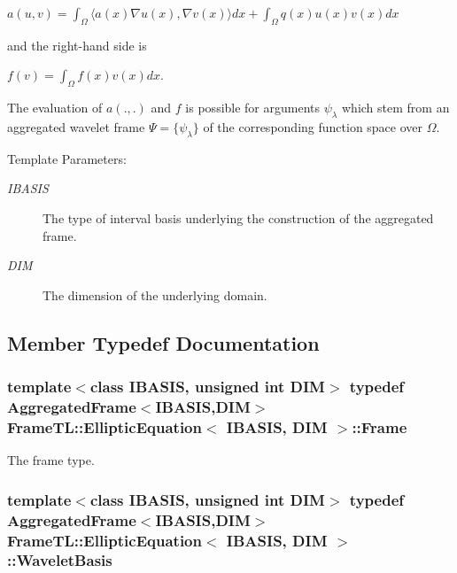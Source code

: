 $a(u,v) = \int_\Omega \langle a(x) \nabla u(x), \nabla v(x)\rangle dx + \int_\Omega q(x) u(x) v(x) dx$

and the right-hand side is

$f(v) = \int_\Omega f(x) v(x) dx$.

The evaluation of $a(.,.)$ and $f$ is possible for arguments $\psi_\lambda$ which stem from an aggregated wavelet frame $\Psi=\{\psi_\lambda\}$ of the corresponding function space over $\Omega$.

\begin{Desc}
\item[Template Parameters:]
\begin{description}
\item[{\em IBASIS}]The type of interval basis underlying the construction of the aggregated frame. \item[{\em DIM}]The dimension of the underlying domain. \end{description}
\end{Desc}


\subsection{Member Typedef Documentation}
\hypertarget{classFrameTL_1_1EllipticEquation_65fa5216492c8a03f841cf910182a00c}{
\subsubsection[Frame]{\setlength{\rightskip}{0pt plus 5cm}template$<$class IBASIS, unsigned int DIM$>$ {\bf typedef} {\bf AggregatedFrame}$<$IBASIS,DIM$>$ {\bf FrameTL::EllipticEquation}$<$ IBASIS, DIM $>$::{\bf Frame}}}
\label{classFrameTL_1_1EllipticEquation_65fa5216492c8a03f841cf910182a00c}


The frame type. \hypertarget{classFrameTL_1_1EllipticEquation_44b9abebf9c101271d3ddec1ce3ffd3a}{
\subsubsection[WaveletBasis]{\setlength{\rightskip}{0pt plus 5cm}template$<$class IBASIS, unsigned int DIM$>$ {\bf typedef} {\bf AggregatedFrame}$<$IBASIS,DIM$>$ {\bf FrameTL::EllipticEquation}$<$ IBASIS, DIM $>$::{\bf WaveletBasis}}}
\label{classFrameTL_1_1EllipticEquation_44b9abebf9c101271d3ddec1ce3ffd3a}


